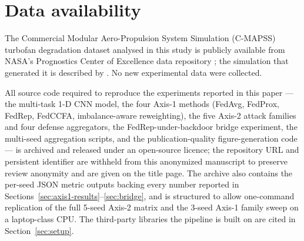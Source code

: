 \documentclass[a4paper,fleqn,doubleblind]{cas-sc}
\begin{document}
\section*{Data availability}
The Commercial Modular Aero-Propulsion System Simulation (C-MAPSS)
turbofan degradation dataset analysed in this study is publicly
available from NASA's Prognostics Center of Excellence data
repository \citep{Saxena2008CMAPSSData}; the simulation that
generated it is described by \citet{Saxena2008CMAPSS}. No new
experimental data were collected.

All source code required to reproduce the experiments reported in
this paper --- the multi-task 1-D CNN model, the four Axis-1 methods
(FedAvg, FedProx, FedRep, FedCCFA, imbalance-aware reweighting), the
five Axis-2 attack families and four defense aggregators, the
FedRep-under-backdoor bridge experiment, the multi-seed aggregation
scripts, and the publication-quality figure-generation code --- is
archived and released under an open-source licence; the repository
URL and persistent identifier are withheld from this anonymized
manuscript to preserve review anonymity and are given on the title
page. The archive also
contains the per-seed JSON metric outputs backing every number
reported in Sections~\ref{sec:axis1-results}--\ref{sec:bridge}, and
is structured to allow one-command replication of the full 5-seed
Axis-2 matrix and the 3-seed Axis-1 family sweep on a laptop-class
CPU. The third-party libraries the pipeline is built on are cited in
Section~\ref{sec:setup}.



\end{document}
